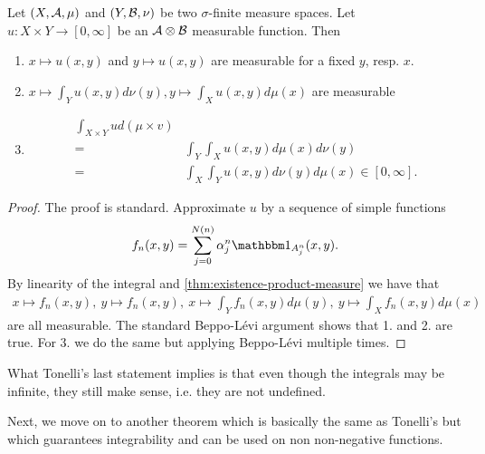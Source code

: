 \begin{thm}[Tonelli]
	\label{thm:tonelli}
	Let $(X, \mathcal{A}, \mu)$ and $(Y, \mathcal{B}, \nu)$ be two $\sigma$-finite measure spaces. Let $u : X \times Y \to [0,\infty]$ be an $\mathcal{A} \otimes \mathcal{B}$ measurable function. Then
	\begin{enumerate}
		\item $x \mapsto u(x, y)$ and $y \mapsto u(x, y)$ are measurable for a fixed $y$, resp. $x$.
		\item $x \mapsto \int_Y u(x, y) d\nu(y), y\mapsto \int_X u(x, y) d\mu(x)$ are measurable
		\item 
		\begin{align}
		\int_{X\times Y} u d(\mu \times v)\\
		= &\int_Y \int_X u(x, y) d\mu(x) d\nu(y)\\
		= &\int_X \int_Y u(x, y) d\nu(y) d\mu(x)
		\in [0, \infty].
		\end{align}
	\end{enumerate}	
\end{thm}

\begin{proof}
	The proof is standard. Approximate $u$ by a sequence of simple functions
	\begin{align*}
		f_n(x, y) = \sum_{j = 0}^{N(n)} \alpha_j^n \ind_{A_j^n}(x, y).
	\end{align*}
	By linearity of the integral and \autoref{thm:existence-product-measure} we have that
	\begin{align*}
		x \mapsto f_n(x, y),\ y \mapsto f_n(x, y),\ x \mapsto \int_Y f_n(x, y) d\mu(y),\ y \mapsto \int_X f_n(x, y) d\mu(x)
	\end{align*}
	are all measurable. The standard Beppo-Lévi argument shows that 1. and 2. are true. For 3. we do the same but applying Beppo-Lévi multiple times.
\end{proof}

What Tonelli's last statement implies is that even though the integrals may be infinite, they still make sense, i.e. they are not undefined.

Next, we move on to another theorem which is basically the same as Tonelli's but which guarantees integrability and can be used on non non-negative functions.

